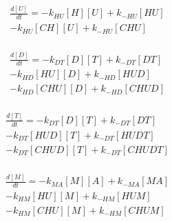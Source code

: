 \begin{equation}
\begin{split}
\frac{d[U]}{dt} =     - k_{HU}[H][U]    + k_{-HU}[HU]     \\%
                      - k_{HU}[CH][U]   + k_{-HU}[CHU]    \\%
\end{split}
\end{equation}

\begin{equation}
\begin{split}
\frac{d[D]}{dt} =     - k_{DT}[D][T]    + k_{-DT}[DT]     \\%
                      - k_{HD}[HU][D]   + k_{-HD}[HUD]    \\%
                      - k_{HD}[CHU][D]  + k_{-HD}[CHUD]   \\%
\end{split}
\end{equation}

\begin{equation}
\begin{split}
\frac{d[T]}{dt} =     - k_{DT}[D][T]    + k_{-DT}[DT]     \\%
                      - k_{DT}[HUD][T]  + k_{-DT}[HUDT]   \\%
                      - k_{DT}[CHUD][T] + k_{-DT}[CHUDT]  \\%
\end{split}
\end{equation}

\begin{equation}
\begin{split}
\frac{d[M]}{dt} =     - k_{MA}[M][A]    + k_{-MA}[MA]     \\%
                      - k_{HM}[HU][M]   + k_{-HM}[HUM]    \\%
                      - k_{HM}[CHU][M]  + k_{-HM}[CHUM]   \\%
\end{split}
\end{equation}

